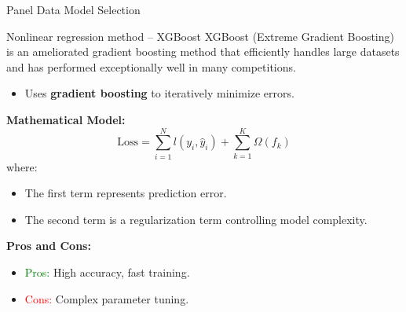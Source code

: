 \documentclass{beamer}
\begin{document}
    \begin{frame}{Panel Data Model Selection}
        \centering
    \end{frame}
    
        

    \begin{frame}{Nonlinear regression method -- XGBoost}
        XGBoost (Extreme Gradient Boosting) is an ameliorated gradient boosting method that efficiently handles large datasets and has performed exceptionally well in many competitions.
        \begin{itemize}
            \item Uses \textbf{gradient boosting} to iteratively minimize errors.
        \end{itemize}

        \textbf{Mathematical Model:}
        \[
            \text{Loss} = \sum_{i=1}^{N} l(y_i, \hat{y}_i) + \sum_{k=1}^{K} \Omega(f_k)
        \]
        where:
        \begin{itemize}
            \item The first term represents prediction error.
            \item The second term is a regularization term controlling model complexity.
        \end{itemize}
        \vspace{0.3cm}
        \textbf{Pros and Cons:}  
        \begin{itemize}
            \item \textcolor{green}{Pros:} High accuracy, fast training.
            \item \textcolor{red}{Cons:} Complex parameter tuning.
        \end{itemize}
    \end{frame}
\end{document}
